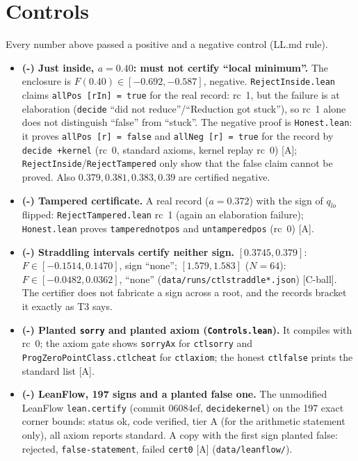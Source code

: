 \documentclass[10pt]{article}
\newcommand{\tier}[1]{\textsf{[#1]}}
\newcommand{\tA}{\tier{A}}
\newcommand{\tCb}{\textcolor{blue!60!black}{\textsf{[C-ball]}}}
\newcommand{\lean}[1]{\texttt{#1}}
\renewcommand{\_}{\textunderscore\penalty0\hspace{0pt}}
\begin{document}
\section{Controls}\label{sec:controls}
Every number above passed a positive and a negative control (LL.md rule).
\begin{itemize}\itemsep=1pt
\item \textbf{(-) Just inside, $a=0.40$: must not certify ``local minimum''.} The enclosure is $F(0.40)\in[-0.692,-0.587]$, negative. \texttt{RejectInside.lean} claims \lean{allPos [rIn] = true} for the real record: rc~1, but the failure is at elaboration (\lean{decide} ``did not reduce''/``Reduction got stuck''), so rc~1 alone does not distinguish ``false'' from ``stuck''. The negative proof is \texttt{Honest.lean}: it proves \lean{allPos [r] = false} and \lean{allNeg [r] = true} for the record by \lean{decide +kernel} (rc~0, standard axioms, kernel replay rc~0) \tA; \texttt{RejectInside}/\texttt{RejectTampered} only show that the false claim cannot be proved. Also $0.379,0.381,0.383,0.39$ are certified negative.
\item \textbf{(-) Tampered certificate.} A real record ($a=0.372$) with the sign of $q_{lo}$ flipped: \texttt{RejectTampered.lean} rc~1 (again an elaboration failure); \texttt{Honest.lean} proves \lean{tampered\_not\_pos} and \lean{untampered\_pos} (rc~0) \tA.
\item \textbf{(-) Straddling intervals certify neither sign.} $[0.3745,0.379]$: $F\in[-0.1514,0.1470]$, sign ``none''; $[1.579,1.583]$ ($N=64$): $F\in[-0.0482,0.0362]$, ``none'' (\texttt{data/runs/ctl\_straddle*.json}) \tCb. The certifier does not fabricate a sign across a root, and the records bracket it exactly as T3 says.
\item \textbf{(-) Planted \lean{sorry} and planted axiom (\texttt{Controls.lean}).} It compiles with rc~0; the axiom gate shows \lean{sorryAx} for \lean{ctl\_sorry} and \lean{ProgZeroPointClass.ctl\_cheat} for \lean{ctl\_axiom}; the honest \lean{ctl\_false} prints the standard list \tA.
\item \textbf{(-) LeanFlow, 197 signs and a planted false one.} The unmodified LeanFlow \lean{lean.certify} (commit 06084ef, \lean{decide\_kernel}) on the 197 exact corner bounds: status ok, code verified, tier A (for the arithmetic statement only), all axiom reports standard. A copy with the first sign planted false: rejected, \texttt{false-statement}, failed \lean{cert\_0} \tA{} (\texttt{data/leanflow/}).

\end{itemize}
\end{document}
